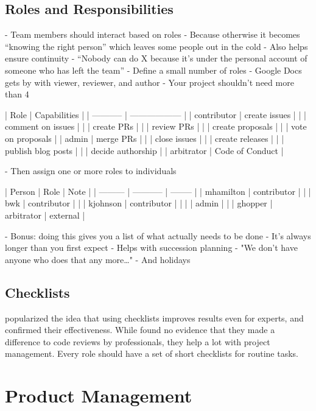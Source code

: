 \documentclass[10pt,letterpaper]{article}
\begin{document}
\subsection*{Roles and Responsibilities}

- Team members should interact based on roles
  - Because otherwise it becomes ``knowing the right person'' which leaves some people out in the cold
  - Also helps ensure continuity
    - ``Nobody can do X because it's under the personal account of someone who has left the team''
- Define a small number of roles
  - Google Docs gets by with viewer, reviewer, and author
  - Your project shouldn't need more than 4

| Role        | Capabilities       |
| ----------- | ------------------ |
| contributor | create issues      |
|             | comment on issues  |
|             | create PRs         |
|             | review PRs         |
|             | create proposals   |
|             | vote on proposals  |
| admin       | merge PRs          |
|             | close issues       |
|             | create releases    |
|             | publish blog posts |
|             | decide authorship  |
| arbitrator  | Code of Conduct    |

- Then assign one or more roles to individuals

| Person    | Role        | Note     |
| --------- | ----------- | -------- |
| mhamilton | contributor |          |
| bwk       | contributor |          |
| kjohnson  | contributor |          |
|           | admin       |          |
| ghopper   | arbitrator  | external |

- Bonus: doing this gives you a list of what actually needs to be done
  - It's always longer than you first expect
- Helps with succession planning
  - "We don't have anyone who does that any more…"
- And holidays

\subsection*{Checklists}

\cite{Gawande2007} popularized the idea that using checklists improves
results even for experts, and \cite{Aveling2013,Ramsay2019} confirmed
their effectiveness. While \cite{Hatton2008} found no evidence that
they made a difference to code reviews by professionals, they help a
lot with project management. Every role should have a set of short
checklists for routine tasks.

\section{Product Management}
\end{document}
